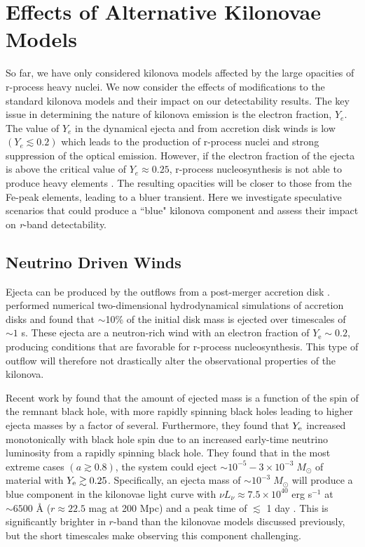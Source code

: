 \section{Effects of Alternative Kilonovae Models}
\label{sec:ch2_altkilo}

So far, we have only considered kilonova models affected by the large opacities of r-process heavy nuclei. We now consider the effects of modifications to the standard kilonova models and their impact on our detectability results. The key issue in determining the nature of kilonova emission is the electron fraction, $Y_e$. The value of $Y_e$ in the dynamical ejecta and from accretion disk winds is low $(Y_e \lesssim 0.2)$ which leads to the production of r-process nuclei and strong suppression of the optical emission. However, if the electron fraction of the ejecta is above the critical value of $Y_e \approx 0.25$, r-process nucleosynthesis is not able to produce heavy elements \citep[particularly the lanthanides][]{Kasen+15}. The resulting opacities will be closer to those from the Fe-peak elements, leading to a bluer transient. Here we investigate speculative scenarios that could produce a ``blue" kilonova component and assess their impact on {\em r}-band detectability.

\subsection{Neutrino Driven Winds}
\label{sec:ch2_neutrino}
Ejecta can be produced by the outflows from a post-merger accretion disk \citep{Dessart+09,FernandezMetzger13,Fernandez+15}. \citet{FernandezMetzger13} performed numerical two-dimensional hydrodynamical simulations of accretion disks and found that $\sim$10\% of the initial disk mass is ejected over timescales of $\sim1$ s. These ejecta are a neutron-rich wind with an electron fraction of $Y_{\text{e}} \sim 0.2$, producing conditions that are favorable for r-process nucleosynthesis. This type of outflow will therefore not drastically alter the observational properties of the kilonova.

Recent work by \citet{Fernandez+15} found that the amount of ejected mass is a function of the spin of the remnant black hole, with more rapidly spinning black holes leading to higher ejecta masses by a factor of several. Furthermore, they found that $Y_{{\rm e}}$ increased monotonically with black hole spin due to an increased early-time neutrino luminosity from a rapidly spinning black hole. They found that in the most extreme cases $(a \gtrsim 0.8)$, the system could eject $\sim10^{-5} - 3\times10^{-3}\;M_{\odot}$ of material with $Y_{{\rm e}} \gtrsim 0.25$. Specifically, an ejecta mass of $\sim10^{-3}\;M_{\odot}$ will produce a blue component in the kilonovae light curve with $\nu L_{\nu} \approx 7.5\times10^{40}$ erg s$^{-1}$ at $\sim6500$ \AA \; ($r \approx 22.5$ mag at 200 Mpc) and a peak time of $\lesssim$ 1 day \citep{Kasen+15}. This is significantly brighter in $r$-band than the kilonovae models discussed previously, but the short timescales make observing this component challenging.

